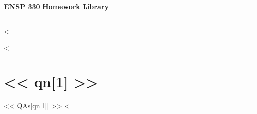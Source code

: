 \documentclass{article}
\newcommand{\chead}[1]
{\begin{center}\large\textbf{#1}\end{center}}
\begin{document}
\chead{ENSP 330 Homework Library}
\hrule
\vspace{10pt}

<%

<%
\section*{<< qn[1] >>}
<< QAs[qn[1]] >>
<%
\end{document}

